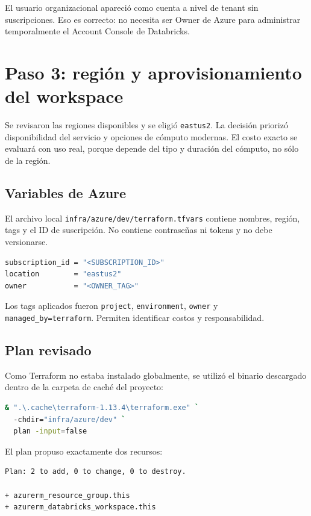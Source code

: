 \documentclass[11pt,a4paper]{article}
\begin{document}
El usuario organizacional apareció como cuenta a nivel de tenant sin suscripciones. Eso es correcto:
no necesita ser Owner de Azure para administrar temporalmente el Account Console de Databricks.

\section{Paso 3: región y aprovisionamiento del workspace}

Se revisaron las regiones disponibles y se eligió \texttt{eastus2}. La decisión priorizó
disponibilidad del servicio y opciones de cómputo modernas. El costo exacto se evaluará con uso real,
porque depende del tipo y duración del cómputo, no sólo de la región.

\subsection{Variables de Azure}

El archivo local \texttt{infra/azure/dev/terraform.tfvars} contiene nombres, región, tags y el ID de
suscripción. No contiene contraseñas ni tokens y no debe versionarse.

\begin{lstlisting}[language=bash]
subscription_id = "<SUBSCRIPTION_ID>"
location        = "eastus2"
owner           = "<OWNER_TAG>"
\end{lstlisting}

Los tags aplicados fueron \texttt{project}, \texttt{environment}, \texttt{owner} y
\texttt{managed\_by=terraform}. Permiten identificar costos y responsabilidad.

\subsection{Plan revisado}

Como Terraform no estaba instalado globalmente, se utilizó el binario descargado dentro de la
carpeta de caché del proyecto:

\begin{lstlisting}[language=bash]
& ".\.cache\terraform-1.13.4\terraform.exe" `
  -chdir="infra/azure/dev" `
  plan -input=false
\end{lstlisting}

El plan propuso exactamente dos recursos:

\begin{lstlisting}
Plan: 2 to add, 0 to change, 0 to destroy.

+ azurerm_resource_group.this
+ azurerm_databricks_workspace.this
\end{lstlisting}
\end{document}
